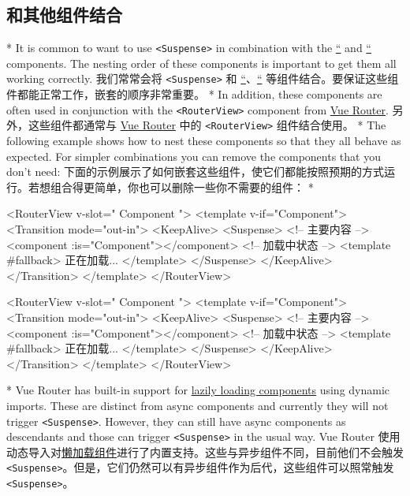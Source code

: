 \begin{paracol}{2}
\subsection{和其他组件结合}
\switchcolumn[0]*%
It is common to want to use \texttt{\textless{}Suspense\textgreater{}}
in combination with the
\href{https://vuejs.org/guide/built-ins/transition.html}{``} and
\href{https://vuejs.org/guide/built-ins/keep-alive.html}{``} components.
The nesting order of these components is important to get them all
working correctly.
\switchcolumn
我们常常会将 \texttt{\textless{}Suspense\textgreater{}} 和
\href{https://cn.vuejs.org/guide/built-ins/transition.html}{``}、\href{https://cn.vuejs.org/guide/built-ins/keep-alive.html}{``}
等组件结合。要保证这些组件都能正常工作，嵌套的顺序非常重要。
\switchcolumn[0]*%
In addition, these components are often used in conjunction with the
\texttt{\textless{}RouterView\textgreater{}} component from
\href{https://router.vuejs.org/}{Vue Router}.
\switchcolumn
另外，这些组件都通常与 \href{https://router.vuejs.org/zh/}{Vue Router}
中的 \texttt{\textless{}RouterView\textgreater{}} 组件结合使用。
\switchcolumn[0]*%
The following example shows how to nest these components so that they
all behave as expected. For simpler combinations you can remove the
components that you don't need:
\switchcolumn
下面的示例展示了如何嵌套这些组件，使它们都能按照预期的方式运行。若想组合得更简单，你也可以删除一些你不需要的组件：
\switchcolumn[0]*%
\begin{codeHtml}
<RouterView v-slot="{ Component }">
  <template v-if="Component">
    <Transition mode="out-in">
      <KeepAlive>
        <Suspense>
          <!-- 主要内容 -->
          <component :is="Component"></component>
          <!-- 加载中状态 -->
          <template #fallback>
            正在加载...
          </template>
        </Suspense>
      </KeepAlive>
    </Transition>
  </template>
</RouterView>
\end{codeHtml}
\switchcolumn
\begin{codeHtml}
<RouterView v-slot="{ Component }">
  <template v-if="Component">
    <Transition mode="out-in">
      <KeepAlive>
        <Suspense>
          <!-- 主要内容 -->
          <component :is="Component"></component>
          <!-- 加载中状态 -->
          <template #fallback>
            正在加载...
          </template>
        </Suspense>
      </KeepAlive>
    </Transition>
  </template>
</RouterView>
\end{codeHtml}
\switchcolumn[0]*%
Vue Router has built-in support for
\href{https://router.vuejs.org/guide/advanced/lazy-loading.html}{lazily
loading components} using dynamic imports. These are distinct from async
components and currently they will not trigger
\texttt{\textless{}Suspense\textgreater{}}. However, they can still have
async components as descendants and those can trigger
\texttt{\textless{}Suspense\textgreater{}} in the usual way.
\switchcolumn
Vue Router
使用动态导入对\href{https://router.vuejs.org/zh/guide/advanced/lazy-loading.html}{懒加载组件}进行了内置支持。这些与异步组件不同，目前他们不会触发
\texttt{\textless{}Suspense\textgreater{}}。但是，它们仍然可以有异步组件作为后代，这些组件可以照常触发
\texttt{\textless{}Suspense\textgreater{}}。
\end{paracol}
